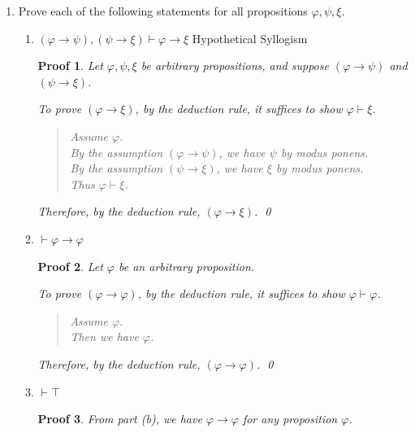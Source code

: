 \documentclass[12pt]{article}
\theoremstyle{proofstyle}
\newtheorem*{proof*}{Proof}
\begin{document}
\begin{enumerate}[left=0pt, itemsep=2em, parsep=1em]
\begin{enumerate}[label=(\alph*), itemsep=1.5em, leftmargin=2em]
\end{enumerate}

\item Prove each of the following statements for all propositions $\varphi, \psi, \xi$.

\begin{enumerate}[label=(\alph*), itemsep=1.5em, leftmargin=2em]

\item $(\varphi \to \psi), (\psi \to \xi) \vdash \varphi \to \xi$ \hfill Hypothetical Syllogism

\begin{proof*}
    Let $\varphi, \psi, \xi$ be arbitrary propositions, and suppose $(\varphi \to \psi)$ and $(\psi \to \xi)$.
    
    To prove $(\varphi \to \xi)$, by the deduction rule, it suffices to show $\varphi \vdash \xi$.
    
    \begin{quote}
        Assume $\varphi$. \\
        By the assumption $(\varphi \to \psi)$, we have $\psi$ by modus ponens. \\
        By the assumption $(\psi \to \xi)$, we have $\xi$ by modus ponens. \\
        Thus $\varphi \vdash \xi$.
    \end{quote}
    
    Therefore, by the deduction rule, $(\varphi \to \xi)$. \qed
\end{proof*}

\item $\vdash \varphi \to \varphi$

\begin{proof*}
    Let $\varphi$ be an arbitrary proposition.
    
    To prove $(\varphi \to \varphi)$, by the deduction rule, it suffices to show $\varphi \vdash \varphi$.
    
    \begin{quote}
        Assume $\varphi$. \\
        Then we have $\varphi$.
    \end{quote}
    
    Therefore, by the deduction rule, $(\varphi \to \varphi)$. \qed
\end{proof*}

\item $\vdash \top$

\begin{proof*}
    From part (b), we have $\varphi \to \varphi$ for any proposition $\varphi$.
    

\end{proof*}
\end{enumerate}
\end{enumerate}
\end{document}
